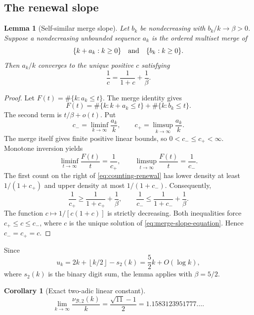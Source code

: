 \documentclass[11pt,oneside]{article}
\newtheorem{lemma}[theorem]{Lemma}
\newtheorem{corollary}[theorem]{Corollary}
\theoremstyle{definition}
\theoremstyle{remark}
\newcommand{\B}{\mathcal B}
\newcommand{\floor}[1]{\left\lfloor #1\right\rfloor}
\begin{document}
\subsection{The renewal slope}

\begin{lemma}[Self-similar merge slope]
\label{lem:merge-slope}
Let \(b_k\) be nondecreasing with \(b_k/k\to\beta>0\).  Suppose a nondecreasing unbounded
sequence \(a_k\) is the ordered multiset merge of
\[
  \{k+a_k:k\ge0\}
  \quad\hbox{and}\quad
  \{b_k:k\ge0\}.
\]
Then \(a_k/k\) converges to the unique positive \(c\) satisfying
\begin{equation}
  \frac1c=\frac1{1+c}+\frac1\beta.
  \label{eq:merge-slope-equation}
\end{equation}
\end{lemma}

\begin{proof}
Let \(F(t)=\#\{k:a_k\le t\}\).  The merge identity gives
\[
 F(t)=\#\{k:k+a_k\le t\}+\#\{k:b_k\le t\}.
 \label{eq:counting-renewal}
\]
The second term is \(t/\beta+o(t)\).  Put
\[
 c_-=\liminf_{k\to\infty}\frac{a_k}{k},
 \qquad
 c_+=\limsup_{k\to\infty}\frac{a_k}{k}.
\]
The merge itself gives finite positive linear bounds, so \(0<c_-\le c_+<\infty\).
Monotone inversion yields
\[
 \liminf_{t\to\infty}\frac{F(t)}t=\frac1{c_+},
 \qquad
 \limsup_{t\to\infty}\frac{F(t)}t=\frac1{c_-}.
\]
The first count on the right of \eqref{eq:counting-renewal} has lower density at least
\(1/(1+c_+)\) and upper density at most \(1/(1+c_-)\).  Consequently,
\[
 \frac1{c_+}\ge\frac1{1+c_+}+\frac1\beta,
 \qquad
 \frac1{c_-}\le\frac1{1+c_-}+\frac1\beta.
\]
The function \(c\mapsto1/[c(1+c)]\) is strictly decreasing.  Both inequalities force
\(c_+\le c\le c_-\), where \(c\) is the unique solution of
\eqref{eq:merge-slope-equation}.  Hence \(c_-=c_+=c\).
\end{proof}

Since
\[
 u_k=2k+\floor{k/2}-s_2(k)=\frac52k+O(\log k),
\]
where \(s_2(k)\) is the binary digit sum, the lemma applies with \(\beta=5/2\).

\begin{corollary}[Exact two-adic linear constant]
\label{cor:p2-slope}
\begin{equation}
 \boxed{\displaystyle
 \lim_{k\to\infty}\frac{\nu_{\B,2}(k)}{k}
 =\frac{\sqrt{11}-1}{2}
 =1.1583123951777\ldots.}
 \label{eq:p2-slope}
\end{equation}
\end{corollary}
\end{document}
